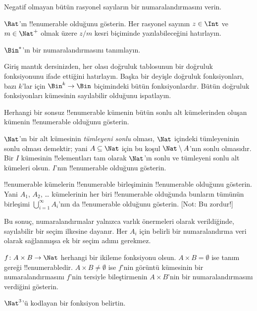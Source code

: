 \documentclass[../../../include/open-logic-section]{subfiles}
\begin{document}
\begin{prob}
Negatif olmayan bütün rasyonel sayıların bir numaralandırmasını verin.
\end{prob}

\begin{prob}
$\Rat$'ın !!{enumerable} olduğunu gösterin. Her rasyonel sayının $z\in\Int$
ve $m\in\Nat^+$ olmak üzere $z/m$ kesri biçiminde yazılabileceğini hatırlayın.
\end{prob}

\begin{prob}
$\Bin^*$'ın bir numaralandırmasını tanımlayın.
\end{prob}

\begin{prob}
Giriş mantık dersinizden, her olası doğruluk tablosunun bir doğruluk
fonksiyonunu ifade ettiğini hatırlayın. Başka bir deyişle doğruluk
fonksiyonları, bazı $k$'lar için $\Bin^k \to \Bin$ biçimindeki bütün
fonksiyonlardır. Bütün doğruluk fonksiyonları kümesinin sayılabilir olduğunu
ispatlayın.
\end{prob}

\begin{prob}
Herhangi bir sonsuz !!{enumerable} kümenin bütün sonlu alt kümelerinden
oluşan kümenin !!{enumerable} olduğunu gösterin.
\end{prob}

\begin{prob}
$\Nat$'ın bir alt kümesinin \emph{tümleyeni sonlu} olması, $\Nat$ içindeki
tümleyeninin sonlu olması demektir; yani $A\subseteq\Nat$ için bu koşul
$\Nat\setminus A$'nın sonlu olmasıdır. Bir $I$ kümesinin !!{element}ları tam
olarak $\Nat$'ın sonlu ve tümleyeni sonlu alt kümeleri olsun. $I$'nın !!{enumerable}
olduğunu gösterin.
\end{prob}

\begin{prob}
!!{enumerable} kümelerin !!{enumerable} birleşiminin !!{enumerable} olduğunu
gösterin. Yani $A_1$, $A_2$, \dots{} kümelerinin her biri !!{enumerable}
olduğunda bunların tümünün birleşimi $\bigcup_{i=1}^\infty A_i$'nın da
!!{enumerable} olduğunu gösterin. [Not: Bu zordur!]
\end{prob}

\begin{editorial}
Bu sonuç, numaralandırmalar yalnızca varlık önermeleri olarak verildiğinde,
sayılabilir bir seçim ilkesine dayanır. Her $A_i$ için belirli bir
numaralandırma veri olarak sağlanmışsa ek bir seçim adımı gerekmez.
\end{editorial}

\begin{prob}
$f\colon A\times B\to\Nat$ herhangi bir ikileme fonksiyonu olsun.
$A\times B=\emptyset$ ise tanım gereği !!{enumerable}dir. $A\times B\neq
\emptyset$ ise $f$'nin görüntü kümesinin bir numaralandırmasını $f$'nin
tersiyle bileştirmenin $A\times B$'nin bir numaralandırmasını verdiğini gösterin.
\end{prob}

\begin{prob}
$\Nat^3$'ü kodlayan bir fonksiyon belirtin.
\end{prob}
\end{document}
